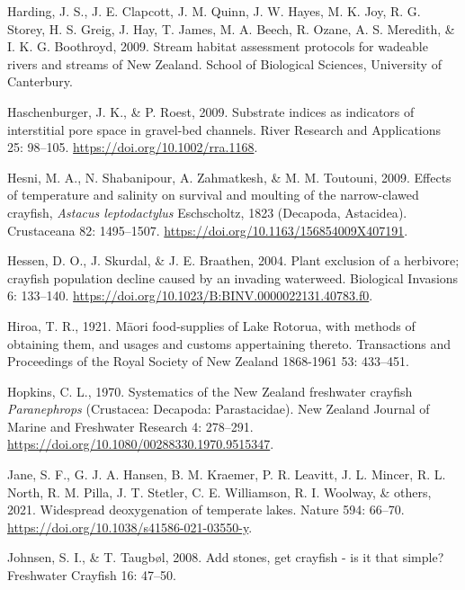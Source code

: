 \documentclass[
  letterpaper,
  DIV=11,
  numbers=noendperiod]{scrartcl}
\newlength{\cslhangindent}
\newenvironment{CSLReferences}[2] %
 {\begin{list}{}{%
  \setlength{\itemindent}{0pt}
  \setlength{\leftmargin}{0pt}
  \setlength{\parsep}{0pt}
  \ifodd #1
   \setlength{\leftmargin}{\cslhangindent}
   \setlength{\itemindent}{-1\cslhangindent}
  \fi
  \setlength{\itemsep}{#2\baselineskip}}}
 {\end{list}}
\begin{document}
\begin{CSLReferences}{0}{1}
Harding, J. S., J. E. Clapcott, J. M. Quinn, J. W. Hayes, M. K. Joy, R.
G. Storey, H. S. Greig, J. Hay, T. James, M. A. Beech, R. Ozane, A. S.
Meredith, \& I. K. G. Boothroyd, 2009. Stream habitat assessment
protocols for wadeable rivers and streams of {New Zealand}. School of
Biological Sciences, University of Canterbury.

Haschenburger, J. K., \& P. Roest, 2009. Substrate indices as indicators
of interstitial pore space in gravel-bed channels. River Research and
Applications 25: 98--105. \url{https://doi.org/10.1002/rra.1168}.

Hesni, M. A., N. Shabanipour, A. Zahmatkesh, \& M. M. Toutouni, 2009.
Effects of temperature and salinity on survival and moulting of the
narrow-clawed crayfish, {\emph{Astacus leptodactylus}} {Eschscholtz},
1823 ({Decapoda}, {Astacidea}). Crustaceana 82: 1495--1507.
\url{https://doi.org/10.1163/156854009X407191}.

Hessen, D. O., J. Skurdal, \& J. E. Braathen, 2004. Plant exclusion of a
herbivore; crayfish population decline caused by an invading waterweed.
Biological Invasions 6: 133--140.
\url{https://doi.org/10.1023/B:BINV.0000022131.40783.f0}.

Hiroa, T. R., 1921. M{ā}ori food-supplies of {Lake Rotorua}, with
methods of obtaining them, and usages and customs appertaining thereto.
Transactions and Proceedings of the Royal Society of New Zealand
1868-1961 53: 433--451.

Hopkins, C. L., 1970. Systematics of the {New Zealand} freshwater
crayfish {\emph{Paranephrops}} ({Crustacea}: {Decapoda}:
{Parastacidae}). New Zealand Journal of Marine and Freshwater Research
4: 278--291. \url{https://doi.org/10.1080/00288330.1970.9515347}.

{Jane, S. F., G. J. A. Hansen, B. M. Kraemer, P. R. Leavitt, J. L.
Mincer, R. L. North, R. M. Pilla, J. T. Stetler, C. E. Williamson, R. I.
Woolway, \& others}, 2021. Widespread deoxygenation of temperate lakes.
Nature 594: 66--70. \url{https://doi.org/10.1038/s41586-021-03550-y}.

Johnsen, S. I., \& T. Taugbøl, 2008. Add stones, get crayfish - is it
that simple? Freshwater Crayfish 16: 47--50.


\end{CSLReferences}
\end{document}
